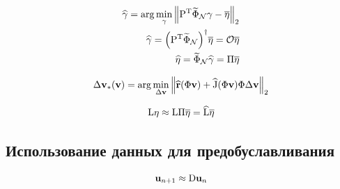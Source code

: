 \begin{align}
    \widehat{\bvec{\gamma}} = \arg \min_{\bvec{\gamma}} \norm[2]{\transpose{P} \widetilde{\Phi}_\mathcal{N} \bvec{\gamma} - \overline{\nlin}} \\
    \widehat{\bvec{\gamma}} = {\left( \transpose{P} \widetilde{\Phi}_\mathcal{N} \right)}^\dagger \overline{\nlin} = \mathcal{O} \overline{\nlin} \\
    \widehat{\nlin} = \widetilde{\Phi}_\mathcal{N} \widehat{\bvec{\gamma}} = \matr{\Pi} \overline{\nlin}
\end{align}


\begin{align}
    \dvunk_\ast (\vunk)= \arg \min_{\dvunk} \norm[2]{\widehat{\resid}(\Phi \vunk) + \widehat{\jac}(\Phi \vunk) \Phi \dvunk}
\end{align}

\begin{align}
    \matr{\matr{L}} \nlin \approx
    \matr{\matr{L}} \matr{\Pi} \overline{\nlin} = \widehat{\matr{\matr{L}}} \overline{\nlin}
\end{align}

\begin{figure}[ht]
    \caption{ \cite{Elizarev2022}}\label{fig:ROM-II}
\end{figure}

\subsection{Использование данных для предобуславливания}

\begin{equation}
    \unk_{n+1} \approx \matr{D} \unk_{n}
\end{equation}

